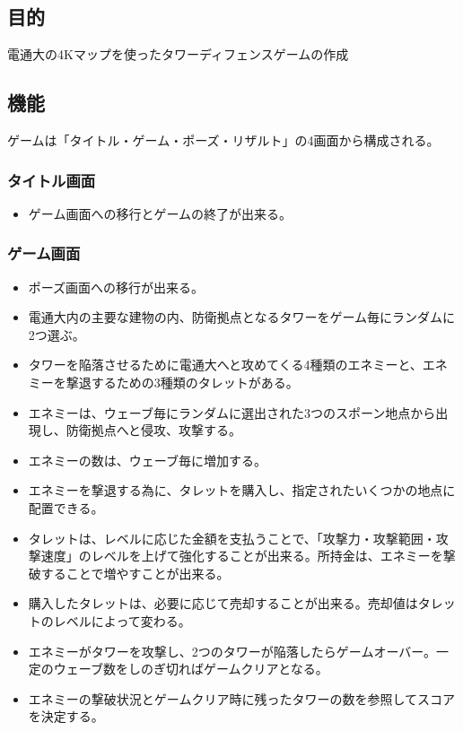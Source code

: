 \documentclass[11pt,a4j]{jarticle}
\begin{document}


\subsection{目的}

電通大の4Kマップを使ったタワーディフェンスゲームの作成

\subsection{機能}

ゲームは「タイトル・ゲーム・ポーズ・リザルト」の4画面から構成される。

\subsubsection{タイトル画面}

\begin{itemize}
    \item
          ゲーム画面への移行とゲームの終了が出来る。
\end{itemize}

\subsubsection{ゲーム画面}

\begin{itemize}
    \item
          ポーズ画面への移行が出来る。
    \item
          電通大内の主要な建物の内、防衛拠点となるタワーをゲーム毎にランダムに2つ選ぶ。
    \item
          タワーを陥落させるために電通大へと攻めてくる4種類のエネミーと、エネミーを撃退するための3種類のタレットがある。
    \item
          エネミーは、ウェーブ毎にランダムに選出された3つのスポーン地点から出現し、防衛拠点へと侵攻、攻撃する。
    \item
          エネミーの数は、ウェーブ毎に増加する。
    \item
          エネミーを撃退する為に、タレットを購入し、指定されたいくつかの地点に配置できる。
    \item
          タレットは、レベルに応じた金額を支払うことで、「攻撃力・攻撃範囲・攻撃速度」のレベルを上げて強化することが出来る。所持金は、エネミーを撃破することで増やすことが出来る。
    \item
          購入したタレットは、必要に応じて売却することが出来る。売却値はタレットのレベルによって変わる。
    \item
          エネミーがタワーを攻撃し、2つのタワーが陥落したらゲームオーバー。一定のウェーブ数をしのぎ切ればゲームクリアとなる。
    \item
          エネミーの撃破状況とゲームクリア時に残ったタワーの数を参照してスコアを決定する。
\end{itemize}
\end{document}
